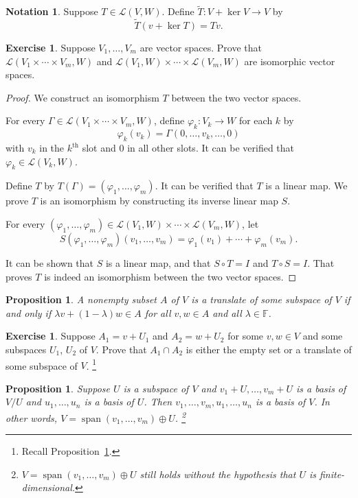 \documentclass{tufte-handout}
\theoremstyle{plain} %
\newtheorem{prop}[thm]{Proposition}
\theoremstyle{definition}
\newtheorem{notn}[thm]{Notation}
\newtheorem{exer}[thm]{Exercise}
\theoremstyle{remark}
\newcommand{\bra}[1]{\mathopen{}\left(#1\right)}
\renewcommand{\phi}{\varphi}
\newcommand{\F}{\mathbb{F}}
\renewcommand{\L}{\mathcal{L}}
\DeclareMathOperator{\spn}{span}
\begin{document}
\begin{notn}
	Suppose $T\in\L\bra{V,W}$. Define $\widetilde{T}: V+\ker V \to V$ by
	\[\widetilde{T}\bra{v+\ker T}=Tv.\]
\end{notn}

\begin{exer}
	Suppose $V_1,\dots,V_m$ are vector spaces. Prove that $\L\bra{V_1\times\cdots\times V_m,W}$ and $\L\bra{V_1,W}\times\cdots\times\L\bra{V_m,W}$ are isomorphic vector spaces. 
\end{exer}
\begin{proof}
	We construct an isomorphism $T$ between the two vector spaces.
	
	For every $\Gamma\in\L\bra{V_1\times\cdots\times V_m,W}$, define $\phi_k:V_k\to W$ for each $k$ by
	\[\phi_k\bra{v_k}=\Gamma\bra{0,\dots,v_k,\dots,0}\]
	with $v_k$ in the $k^\text{th}$ slot and $0$ in all other slots. It can be verified that $\phi_k\in\L\bra{V_k,W}$.

	Define $T$ by $T\bra{\Gamma}=\bra{\phi_1,\dots,\phi_m}$. It can be verified that $T$ is a linear map. We prove $T$ is an isomorphism by constructing its inverse linear map $S$.

	For every $\bra{\phi_1,\dots,\phi_m}\in\L\bra{V_1,W}\times\cdots\times\L\bra{V_m,W}$, let
	\[S\bra{\phi_1,\dots,\phi_m}\bra{v_1,\dots,v_m}=\phi_1\bra{v_1}+\cdots+\phi_m\bra{v_m}.\]
	
	It can be shown that $S$ is a linear map, and that $S\circ T=I$ and $T\circ S=I$. That proves $T$ is indeed an isomorphism between the two vector spaces.
\end{proof}

\begin{prop}\label{prop: test for translate}
	A nonempty subset $A$ of $V$ is a translate of some subspace of $V$ if and only if $\lambda v+\bra{1-\lambda}w\in A$ for all $v,w\in A$ and all $\lambda\in\F$.
\end{prop}

\begin{exer}
	Suppose $A_1=v+U_1$ and $A_2=w+U_2$ for some $v,w\in V$ and some subspaces $U_1$, $U_2$ of $V$. Prove that $A_1\cap A_2$ is either the empty set or a translate of some subspace of $V$.%
    \footnote{Recall Proposition~\ref{prop: test for translate}.}
\end{exer}

\begin{prop}\label{prop: direct sum from quotient space}
	Suppose $U$ is a subspace of $V$ and $v_1+U,\dots,v_m+U$ is a basis of $V/U$ and $u_1,\dots,u_n$ is a basis of $U$. Then $v_1,\dots,v_m,u_1,\dots,u_n$ is a basis of $V$. In other words, $V=\spn(v_1,\dots,v_m)\oplus U$.%
    \footnote{$V=\spn(v_1,\dots,v_m)\oplus U$ still holds without the hypothesis that $U$ is finite-dimensional.}
\end{prop}
\end{document}
